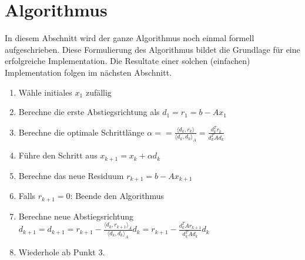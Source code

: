 \section{Algorithmus\label{cg:section:voraussetzungen}}

In diesem Abschnitt wird der ganze Algorithmus noch einmal formell aufgeschrieben.
Diese Formulierung des Algorithmus bildet die Grundlage für eine erfolgreiche Implementation.
Die Resultate einer solchen (einfachen) Implementation folgen im nächsten Abschnitt.

\begin{enumerate}
	\item Wähle initiales $x_1$ zufällig
	\item Berechne die erste Abstiegsrichtung als $d_1 = r_1 =  b-Ax_1$
	\item Berechne die optimale Schrittlänge  $ \alpha	= 	\displaystyle  = \frac{\langle d_k , r_k \rangle}{\langle d_k , d_k \rangle_A} 
																			= \frac{d_k^T  r_k}{d_k^T A d_k }$
	\item Führe den Schritt aus $x_{k+1} = x_k + \alpha d_k$
	\item Berechne das neue Residuum $r_{k+1} = b-Ax_{k+1}$
	\item Falls $r_{k+1} = 0$: Beende den Algorithmus
	\item Berechne neue Abstiegsrichtung $d_{k+1} = d_{k+1}	= 	r_{k+1} - \displaystyle \frac{\langle d_k , r_{k+1} \rangle_A}{\langle d_k , d_k \rangle_A} d_k 
															= r_{k+1} - \displaystyle \frac{d_k^T A r_{k+1}}{d_k^T A d_k} d_k $
	\item Wiederhole ab Punkt 3.
\end{enumerate}